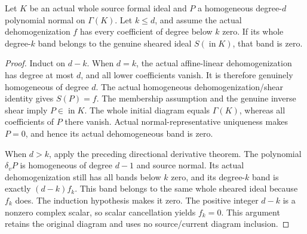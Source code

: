 \begin{theorem}
\label{hir:actual-first-dehom-normal-band-initial-independence}
\leanok
Let $K$ be an actual whole source formal ideal and $P$ a homogeneous
degree-$d$ polynomial normal on $\Gamma(K)$. Let $k\le d$, and assume
the actual dehomogenization $f$ has every coefficient of degree below
$k$ zero. If its whole degree-$k$ band belongs to the genuine sheared
ideal $S(\operatorname{in}K)$, that band is zero.
\end{theorem}
\begin{proof}
Induct on $d-k$. When $d=k$, the actual affine-linear dehomogenization
has degree at most $d$, and all lower coefficients vanish. It is
therefore genuinely homogeneous of degree $d$. The actual homogeneous
dehomogenization/shear identity gives $S(P)=f$. The membership assumption
and the genuine inverse shear imply $P\in\operatorname{in}K$.
The whole initial diagram equals $\Gamma(K)$, whereas all coefficients
of $P$ there vanish. Actual normal-representative uniqueness makes
$P=0$, and hence its actual dehomogeneous band is zero.

When $d>k$, apply the preceding directional derivative theorem. The
polynomial $\delta_vP$ is homogeneous of degree $d-1$ and source
normal. Its actual dehomogenization still has all bands below $k$ zero,
and its degree-$k$ band is exactly $(d-k)f_k$. This band belongs to the
same whole sheared ideal because $f_k$ does. The induction hypothesis
makes it zero. The positive integer $d-k$ is a nonzero complex scalar,
so scalar cancellation yields $f_k=0$. This argument retains the
original diagram and uses no source/current diagram inclusion.
\end{proof}

